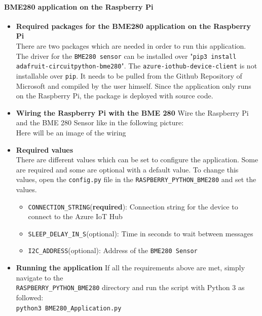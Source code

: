 \documentclass[a4paper]{article}
\begin{document}
			\paragraph{BME280 application on the Raspberry Pi}
			
			\begin{itemize}
				\item \textbf{Required packages for the BME280 application on the Raspberry Pi}\\
				There are two packages which are needed in order to run this application. 
				The driver for the \texttt{BME280 sensor} can be installed over "\texttt{pip3 install adafruit-circuitpython-bme280}".
				The \texttt{azure-iothub-device-client} is not installable over \texttt{pip}.
				It needs to be pulled from the Github Repository of Microsoft and compiled by the user himself.
				Since the application only runs on the Raspberry Pi, the package is deployed with source code.
			
				\item \textbf{Wiring the Raspberry Pi with the BME 280}
				Wire the Raspberry Pi and the BME 280 Sensor like in the following picture:
				\\
				Here will be an image of the wiring
				\\
				\item \textbf{Required values}\\
				There are different values which can be set to configure the application.
				Some are required and some are optional with a default value.
				To change this values, open the \texttt{config.py} file in the \texttt{RASPBERRY\_PYTHON\_BME280} and set the values.
				\begin{itemize}
					\item \texttt{CONNECTION\_STRING}(\textbf{required}): Connection string for the device to connect to the Azure IoT Hub
					\item \texttt{SLEEP\_DELAY\_IN\_S}(optional): Time in seconds to wait between messages
					\item \texttt{I2C\_ADDRESS}(optional): Address of the \texttt{BME280 Sensor}
					\\
				\end{itemize}
				
				\item \textbf{Running the application}
				If all the requirements above are met, simply navigate to the \\ \texttt{RASPBERRY\_PYTHON\_BME280} directory and run the script with Python 3 as followed:
				\\
				\texttt{python3 BME280\_Application.py}
			\end{itemize}
		
\end{document}
